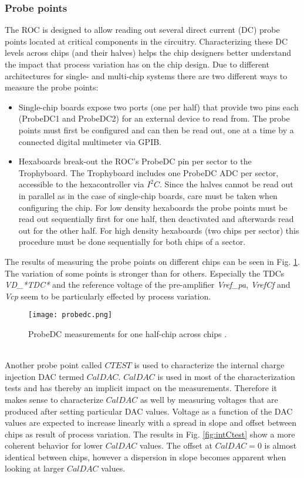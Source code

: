 \documentclass[../../main.tex]{subfiles}
\begin{document}
\subsubsection{Probe points}
The ROC is designed to allow reading out several direct current (DC) probe points located at critical components in the circuitry. Characterizing these DC levels across chips (and their halves) helps the chip designers better understand the impact that process variation has on the chip design. Due to different architectures for single- and multi-chip systems there are two different ways to measure the probe points:
\begin{itemize}
\item Single-chip boards expose two ports (one per half) that provide two pins each (ProbeDC1 and ProbeDC2) for an external device to read from. The probe points must first be configured and can then be read out, one at a time by a connected digital multimeter via GPIB.
\item Hexaboards break-out the ROC's ProbeDC pin per sector to the Trophyboard. The Trophyboard includes one ProbeDC ADC per sector, accessible to the hexacontroller via $I^2C$. Since the halves cannot be read out in parallel as in the case of single-chip boards, care must be taken when configuring the chip. For low density hexaboards the probe points must be read out sequentially first for one half, then deactivated and afterwards read out for the other half. For high density hexaboards (two chips per sector) this procedure must be done sequentially for both chips of a sector.
\end{itemize}
The results of measuring the probe points on different chips can be seen in Fig. \ref{fig:probeDC}. The variation of some points is stronger than for others. Especially the TDCs \textit{VD\_*TDC*} and the reference voltage of the pre-amplifier \textit{Vref\_pa}, \textit{VrefCf} and \textit{Vcp} seem to be particularly effected by process variation.\\
\begin{figure}[htp]
	\begin{center}
		\texttt{[image: probedc.png]}
		\caption{ProbeDC measurements for one half-chip across chips \cite{al}.}
		\label{fig:probeDC}
	\end{center}
\end{figure}
\\
Another probe point called $CTEST$ is used to characterize the internal charge injection DAC termed $CalDAC$. $CalDAC$ is used in most of the characterization tests and has thereby an implicit impact on the measurements. Therefore it makes sense to characterize $CalDAC$ as well by measuring voltages that are produced after setting particular DAC values. Voltage as a function of the DAC values are expected to increase linearly with a spread in slope and offset between chips as result of process variation. The results in Fig. \ref{fig:intCtest} show a more coherent behavior for lower $CalDAC$ values. The offset at $CalDAC=0$ is almost identical between chips, however a dispersion in slope becomes apparent when looking at larger $CalDAC$ values.\\
\end{document}
